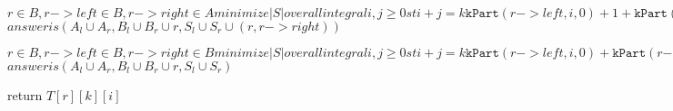 \documentclass[11pt]{article}
\begin{document}
          $r \in B, r->left \in B, r->right \in A
              minimize |S| over all integral i,j \geq 0 st i+j = k
                    \mathtt{kPart}(r->left,i,0) + 1 + \mathtt{kPart}(r->right,j,1)$
                $answer is (A_l \cup A_r,B_l \cup B_r \cup {r},S_l \cup S_r \cup {(r, r->right)})$

          $r \in B, r->left \in B, r->right \in B
              minimize |S| over all integral i,j \geq 0 st i+j = k
                    \mathtt{kPart}(r->left,i,0) +     \mathtt{kPart}(r->right,j,0)$
                $answer is (A_l \cup A_r,B_l \cup B_r \cup {r},S_l \cup S_r)$


   return $T[r][k][i]$
\end{document}
